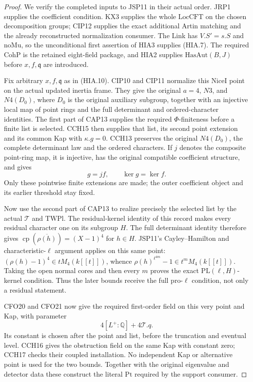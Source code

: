 \begin{proof}
We verify the completed inputs to JSP11 in their actual order.
JRP1 supplies the coefficient condition.  KX3 supplies the
whole \(\mathrm{LocCFT}\) on the chosen decomposition
groups; CIP12 supplies the exact additional Artin matching
and the already reconstructed normalization consumer.
The Link has \(V.S'=s.S\) and \(\mathrm{noMu}\), so the
unconditional first assertion of HIA3 supplies (HIA.7).
The required \(\mathrm{CohP}\) is the retained eight-field
package, and HIA2 supplies \(\mathrm{HasAut}(B,J)\)
before \(x,f,\mathfrak q\) are introduced.

Fix arbitrary \(x,f,\mathfrak q\) as in (HIA.10).
CIP10 and CIP11 normalize this \(\mathrm{NiceI}\) point
on the actual updated inertia frame.  They give the original
\(a=4\), \(N3\), and \(N4(D_0)\), where \(D_0\)
is the original auxiliary subgroup, together with an
injective local map of point rings and the full determinant
and ordered-character identities.  The first part of CAP13
supplies the required \(\Phi\)-finiteness before a finite
list is selected.  CCH15 then supplies that list, its second
point extension and its common Kap with \(\kappa.g=0\).
CCH13 preserves the original \(N4(D_0)\), the complete
determinant law and the ordered characters.  If \(j\)
denotes the composite point-ring map, it is injective, has
the original compatible coefficient structure, and gives
\[
                             g=jf,\qquad\ker g=\ker f.
 \tag{HIA.11}
\]
Only these pointwise finite extensions are made; the outer
coefficient object and its earlier threshold stay fixed.

Now use the second part of CAP13 to realize precisely the
selected list by the actual \(\mathcal T\) and
\(\mathrm{TWPl}\).  The residual-kernel identity of this
record makes every residual character one on its subgroup
\(H\).  The full determinant identity therefore gives
\(\operatorname{cp}(\overline{\rho(h)})=(X-1)^4\)
for \(h\in H\).  JSP11's Cayley--Hamilton and
characteristic-\(\ell\) argument applies on this same
point: \((\rho(h)-1)^4\in tM_4(k[[t]])\), whence
\(\rho(h)^{\ell^{4m}}-1\in t^mM_4(k[[t]])\).
Taking the open normal cores and then every \(m\)
proves the exact \(\mathrm{PL}(\ell,H)\)-kernel
condition.  Thus the later bounds receive the full pro-\(\ell\)
condition, not only a residual statement.

CFO20 and CFO21 now give the required first-order field
on this very point and Kap, with parameter
\[
                            4[L^+:\mathbb Q]+4\mathcal T.q.
 \tag{HIA.12}
\]
Its constant is chosen after the point and list, before
the truncation and eventual level.  CCH16 gives the
obstruction field on the same Kap with constant zero;
CCH17 checks their coupled installation.  No independent
Kap or alternative point is used for the two bounds.
Together with the original eigenvalue and detector data
these construct the literal \(\mathrm{Pt}\) required
by the support consumer.


\end{proof}
